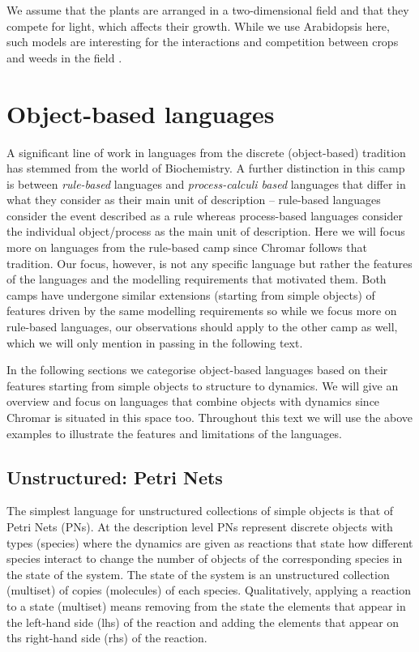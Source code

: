 We assume that the plants are arranged in a two-dimensional field and that they
compete for light, which affects their growth. While we use Arabidopsis here,
such models are interesting for the interactions and competition between crops
and weeds in the field \citep{rajcan_understanding_2001}.


\section{Object-based languages}
\label{sec:objectLangs}
A significant line of work in languages from the discrete (object-based)
tradition has stemmed from the world of Biochemistry. A further distinction in
this camp is between \emph{rule-based} languages and \emph{process-calculi
  based} languages that differ in what they consider as their main unit of
description -- rule-based languages consider the event described as a rule
whereas process-based languages consider the individual object/process as the
main unit of description. Here we will focus more on languages from the
rule-based camp since Chromar follows that tradition. Our focus, however, is not
any specific language but rather the features of the languages and the modelling
requirements that motivated them. Both camps have undergone similar extensions
(starting from simple objects) of features driven by the same modelling
requirements so while we focus more on rule-based languages, our observations
should apply to the other camp as well, which we will only mention in passing in
the following text.

In the following sections we categorise object-based languages based on their
features starting from simple objects to structure to dynamics. We will give an
overview and focus on languages that combine objects with dynamics since Chromar
is situated in this space too. Throughout this text we will use the above
examples to illustrate the features and limitations of the languages.

\subsection{Unstructured: Petri Nets}
\label{subsec:pns}
The simplest language for unstructured collections of simple objects is that of
Petri Nets (PNs). At the description level PNs represent discrete objects with
types (species) where the dynamics are given as reactions that state how
different species interact to change the number of objects of the corresponding
species in the state of the system. The state of the system is an unstructured
collection (multiset) of copies (molecules) of each species. Qualitatively,
applying a reaction to a state (multiset) means removing from the state the
elements that appear in the left-hand side (lhs) of the reaction and adding the
elements that appear on ths right-hand side (rhs) of the reaction.

